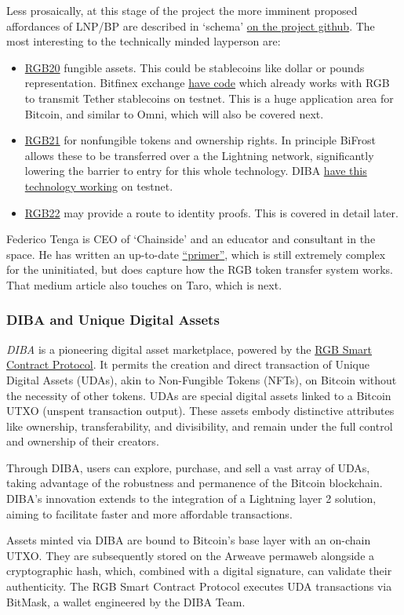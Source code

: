Less prosaically, at this stage of the project the more imminent proposed affordances of LNP/BP are described in `schema' \href{https://github.com/LNP-BP/LNPBPs}{on the project github}. The most interesting to the technically minded layperson are:
\begin{itemize}
\item \href{https://github.com/LNP-BP/LNPBPs/blob/master/lnpbp-0020.md}{RGB20} fungible assets. This could be stablecoins like dollar or pounds representation. Bitfinex exchange \href{https://github.com/RGB-Tools/rgb-lightning-sample}{have code} which already works with RGB to transmit Tether stablecoins on testnet. This is a huge application area for Bitcoin, and similar to Omni, which will also be covered next.
\item \href{https://github.com/LNP-BP/LNPBPs/blob/master/lnpbp-0021.md}{RGB21} for nonfungible tokens and ownership rights. In principle BiFrost allows these to be transferred over a the Lightning network, significantly lowering the barrier to entry for this whole technology. DIBA \href{https://diba.io/}{have this technology working} on testnet.
\item \href{https://github.com/LNP-BP/LNPBPs/issues/29}{RGB22} may provide a route to identity proofs. This is covered in detail later.
\end{itemize}
Federico Tenga is CEO of `Chainside' and an educator and consultant in the space. He has written an up-to-date \href{https://medium.com/@FedericoTenga/understanding-rgb-protocol-7dc7819d3059}{``primer''}, which is still extremely complex for the uninitiated, but does capture how the RGB token transfer system works. That medium article also touches on Taro, which is next.
\subsubsection{DIBA and Unique Digital Assets}
\textit{DIBA} is a pioneering digital asset marketplace, powered by the \href{https://www.rgb.tech/}{RGB Smart Contract Protocol}. It permits the creation and direct transaction of Unique Digital Assets (UDAs), akin to Non-Fungible Tokens (NFTs), on Bitcoin without the necessity of other tokens. UDAs are special digital assets linked to a Bitcoin UTXO (unspent transaction output). These assets embody distinctive attributes like ownership, transferability, and divisibility, and remain under the full control and ownership of their creators.\par
Through DIBA, users can explore, purchase, and sell a vast array of UDAs, taking advantage of the robustness and permanence of the Bitcoin blockchain. DIBA's innovation extends to the integration of a Lightning layer 2 solution, aiming to facilitate faster and more affordable transactions.\par
Assets minted via DIBA are bound to Bitcoin's base layer with an on-chain UTXO. They are subsequently stored on the Arweave permaweb alongside a cryptographic hash, which, combined with a digital signature, can validate their authenticity. The RGB Smart Contract Protocol executes UDA transactions via BitMask, a wallet engineered by the DIBA Team.
